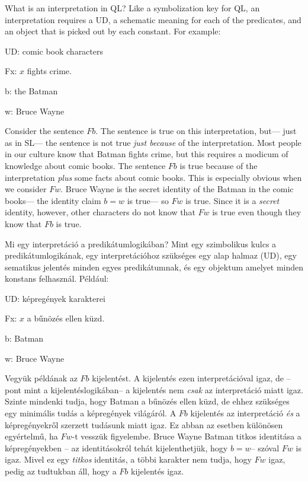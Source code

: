 What is an interpretation in QL? Like a symbolization key for QL, an interpretation requires a UD, a schematic meaning for each of the predicates, and an object that is picked out by each constant. For example:
\begin{ekey}
\item[UD:] comic book characters
\item[Fx:] $x$ fights crime.
\item[b:] the Batman
\item[w:] Bruce Wayne
\end{ekey}
Consider the sentence $Fb$. The sentence is true on this interpretation, but--- just as in SL--- the sentence is not true \emph{just because} of the interpretation. Most people in our culture know that Batman fights crime, but this requires a modicum of knowledge about comic books. The sentence $Fb$ is true because of the interpretation \emph{plus} some facts about comic books. This is especially obvious when we consider $Fw$. Bruce Wayne is the secret identity of the Batman in the comic books--- the identity claim $b=w$ is true--- so $Fw$ is true. Since it is a \emph{secret} identity, however, other characters do not know that $Fw$ is true even though they know that $Fb$ is true.

Mi egy interpretáció a predikátumlogikában? Mint egy szimbolikus kulcs a predikátumlogikának, egy interpretációhoz szükséges egy alap halmaz (UD), egy sematikus jelentés minden egyes predikátumnak, és egy objektum amelyet minden konstans felhasznál. Például:
\begin{ekey}
\item[UD:] képregények karakterei
\item[Fx:] $x$ a bűnözés ellen küzd.
\item[b:] Batman
\item[w:] Bruce Wayne
\end{ekey}
Vegyük példának az $Fb$ kijelentést. A kijelentés ezen interpretációval igaz, de --pont mint a kijelentéslogikában-- a kijelentés nem \emph{csak} az interpretáció miatt igaz. Szinte mindenki tudja, hogy Batman a bűnözés ellen küzd, de ehhez szükséges egy minimális tudás a képregények világáról. A $Fb$ kijelentés az interpretáció \emph{és} a képregényekről szerzett tudásunk miatt igaz. Ez abban az esetben különösen egyértelmű, ha $Fw$-t vesszük figyelembe. Bruce Wayne Batman titkos identitása a képregényekben -- az identitásokról tehát kijelenthetjük, hogy $b=w$-- szóval $Fw$ is igaz. Mivel ez egy \emph{titkos} identitás, a többi karakter nem tudja, hogy $Fw$ igaz, pedig az tudtukban áll, hogy a $Fb$ kijelentés igaz.


